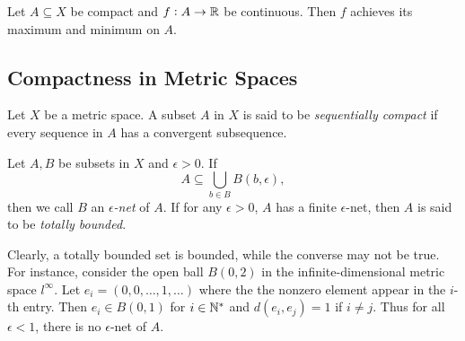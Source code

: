 \begin{cor}
Let $A \subseteq X$ be compact and $f: A \to \mathbb{R}$ be continuous. 
Then $f$ achieves its maximum and minimum on $A$. 
\end{cor}

\subsection{Compactness in Metric Spaces}
\begin{defn}
Let $X$ be a metric space. 
A subset $A$ in $X$ is said to be \emph{sequentially compact} if every 
sequence in $A$ has a convergent subsequence. 
\end{defn}

\begin{defn}
Let $A, B$ be subsets in $X$ and $\epsilon > 0$. 
If 
\begin{equation*}
    A \subseteq \bigcup_{b \in B} B(b, \epsilon), 
\end{equation*}
then we call $B$ an \emph{$\epsilon$-net} of $A$. 
If for any $\epsilon > 0$, $A$ has a finite $\epsilon$-net, then $A$ is 
said to be \emph{totally bounded}. 
\end{defn}

Clearly, a totally bounded set is bounded, while the converse may not be 
true. 
For instance, consider the open ball $B(0, 2)$ in the infinite-dimensional 
metric space $l^\infty$. 
Let $e_i = \left( 0, 0, \ldots, 1, \ldots \right)$ where the the 
nonzero element appear in the $i$-th entry. 
Then $e_i \in B(0, 1)$ for $i \in \mathbb{N}^\ast$ and $d(e_i, e_j) = 1$ 
if $i \neq j$. 
Thus for all $\epsilon < 1$, there is no $\epsilon$-net of $A$. 

